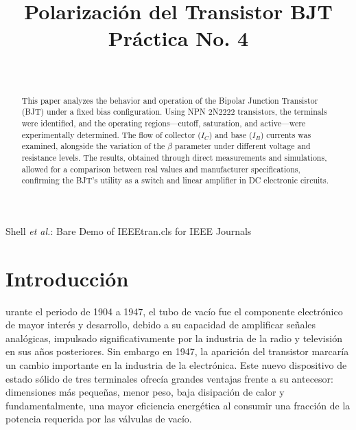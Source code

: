 \documentclass[journal]{IEEEtran}
\begin{document}
\title{Polarización del Transistor BJT\\ \small{Práctica No. 4}}

\author{
    \\
}
        
{Shell \MakeLowercase{\textit{et al.}}: Bare Demo of IEEEtran.cls for IEEE Journals}

\maketitle

\begin{abstract}
    This paper analyzes the behavior and operation of the Bipolar Junction Transistor (BJT) under a fixed bias configuration. 
    Using NPN 2N2222 transistors, the terminals were identified, and the operating regions—cutoff, saturation, and active—were experimentally determined. 
    The flow of collector ($I_C$) and base ($I_B$) currents was examined, alongside the variation of the $\beta$ parameter under different voltage and resistance levels. 
    The results, obtained through direct measurements and simulations, allowed for a comparison between real values and manufacturer specifications, confirming the 
    BJT's utility as a switch and linear amplifier in DC electronic circuits.
\end{abstract}

\section{Introducción}

    urante el periodo de 1904 a 1947, el tubo de vacío fue el componente electrónico de mayor interés y 
    desarrollo, debido a su capacidad de amplificar señales analógicas, impulsado significativamente por la industria de la radio y televisión
    en sus años posteriores. Sin embargo en 1947, la aparición del transistor  marcaría un cambio importante en la industria
    de la electrónica.  Este nuevo dispositivo de estado sólido de tres terminales ofrecía grandes ventajas frente a su antecesor:
    dimensiones más pequeñas, menor peso, baja disipación de calor y fundamentalmente,  una mayor eficiencia energética al consumir
    una fracción de la potencia requerida por las válvulas de vacío.
 
\end{document}
